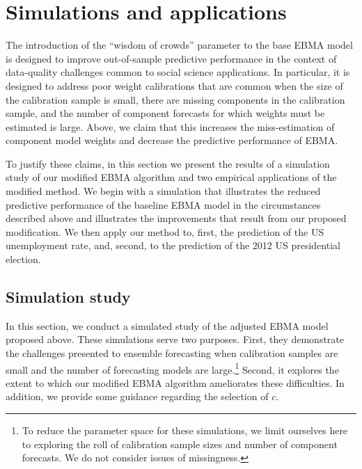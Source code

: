 \documentclass[12pt,fullpage,endnotes]{article}
\begin{document}
\section{Simulations and applications}
\label{empirics}

The introduction of the ``wisdom of crowds'' parameter to the base
EBMA model is designed to improve out-of-sample predictive performance
in the context of data-quality challenges common to social science
applications.  In particular, it is designed to address poor weight
calibrations that are common when the size of the calibration sample
is small, there are missing components in the calibration sample, and
the number of component forecasts for which weights must be estimated
is large.  Above, we claim that this increases the miss-estimation of
component model weights and decrease the predictive performance of
EBMA.

To justify these claims, in this section we present the results of a
simulation study of our modified EBMA algorithm and two empirical
applications of the modified method.  We begin with a simulation that
illustrates the reduced predictive performance of the baseline EBMA
model in the circumstances described above and illustrates the
improvements that result from our proposed modification.  We then
apply our method to, first, the prediction of the US unemployment
rate, and, second, to the prediction of the 2012 US presidential
election.

\subsection{Simulation study} 

In this section, we conduct a simulated study of the adjusted EBMA
model proposed above.  These simulations serve two purposes.  First,
they demonstrate the challenges presented to ensemble forecasting when
calibration samples are small and the number of forecasting models are
large.\footnote{To reduce the parameter space for these simulations,
  we limit ourselves here to exploring the roll of calibration sample
  sizes and number of component forecasts.  We do not consider issues
  of missingness.}  Second, it explores the extent to which our
modified EBMA algorithm ameliorates these difficulties.  In addition,
we provide some guidance regarding the selection of $c$.
\end{document}
